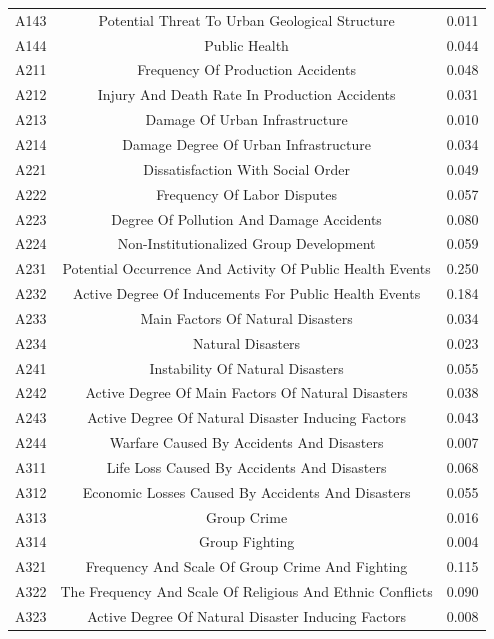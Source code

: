 \documentclass[12pt]{article}  %
\begin{document}
\begin{table}[!ht]
\begin{tabular}{ccc}
        A143 & Potential Threat To Urban Geological Structure&0.011  \\ 
        A144 &  Public Health&0.044 \\ 
        A211 & Frequency Of Production Accidents&0.048  \\ 
        A212 & Injury And Death Rate In Production Accidents&0.031  \\ 
        A213 & Damage Of Urban Infrastructure&0.010 \\ 
        A214 & Damage Degree Of Urban Infrastructure &0.034 \\ 
        A221 & Dissatisfaction With Social Order &0.049 \\ 
        A222 & Frequency Of Labor Disputes &0.057 \\ 
        A223 & Degree Of Pollution And Damage Accidents &0.080 \\ 
        A224 & Non-Institutionalized Group Development &0.059 \\ 
        A231 & Potential Occurrence And Activity Of Public Health Events &0.250 \\ 
        A232 & Active Degree Of Inducements For Public Health Events &0.184 \\ 
        A233 & Main Factors Of Natural Disasters &0.034\\ 
        A234 & Natural Disasters &0.023\\ 
        A241 & Instability Of Natural Disasters &0.055 \\ 
        A242 & Active Degree Of Main Factors Of Natural Disasters  &0.038\\ 
        A243 & Active Degree Of Natural Disaster Inducing Factors  &0.043\\ 
        A244 & Warfare Caused By Accidents And Disasters &0.007 \\ 
        A311 & Life Loss Caused By Accidents And Disasters &0.068 \\ 
        A312 & Economic Losses Caused By Accidents And Disasters  &0.055\\ 
        A313 & Group Crime &0.016 \\ 
        A314 & Group Fighting  &0.004\\ 
        A321 & Frequency And Scale Of Group Crime And Fighting&0.115  \\ 
        A322 & The Frequency And Scale Of Religious And Ethnic Conflicts &0.090 \\ 
        A323 & Active Degree Of Natural Disaster Inducing Factors  &0.008\\ 

\end{tabular}
\end{table}
\end{document}
